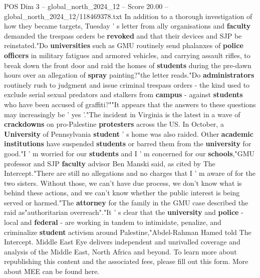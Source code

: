 \begin{textsample}{POS Dim 3 – global\_north\_2024\_12 – Score 20.00 – global\_north\_2024\_12/118469378.txt}
In addition to a thorough investigation of how they became targets, Tuesday ' s letter from ally organisations and \textbf{faculty} demanded the trespass orders be \textbf{revoked} and that their devices and SJP be reinstated."Do \textbf{universities} such as GMU routinely send phalanxes of \textbf{police} \textbf{officers} in military fatigues and armored vehicles, and carrying assault rifles, to break down the front door and raid the homes of \textbf{students} during the pre-dawn hours over an allegation of \textbf{spray} painting?"the letter reads."Do \textbf{administrators} routinely rush to judgment and issue criminal trespass orders - the kind used to exclude serial sexual predators and stalkers from \textbf{campus} - against \textbf{students} who have been accused of graffiti?""It appears that the answers to these questions may increasingly be ' yes '."The incident in Virginia is the latest in a wave of \textbf{crackdowns} on pro-Palestine \textbf{protesters} across the US.
In October, a \textbf{University} of Pennsylvania \textbf{student} ' s home was also raided.
Other \textbf{academic} \textbf{institutions} have suspended \textbf{students} or barred them from the \textbf{university} for good."I ' m worried for our \textbf{students} and I ' m concerned for our \textbf{schools},"GMU professor and SJP \textbf{faculty} advisor Ben Manski said, as cited by The Intercept."There are still no allegations and no charges that I ' m aware of for the two sisters.
Without those, we can't have due process, we don't know what is behind these actions, and we can't know whether the public interest is being served or harmed."The \textbf{attorney} for the family in the GMU case described the raid as"authoritarian overreach"."It ' s clear that the \textbf{university} and \textbf{police} - local and \textbf{federal} - are working in tandem to intimidate, penalize, and criminalize \textbf{student} activism around Palestine,"Abdel-Rahman Hamed told The Intercept.
Middle East Eye delivers independent and unrivalled coverage and analysis of the Middle East, North Africa and beyond.
To learn more about republishing this content and the associated fees, please fill out this form.
More about MEE can be found here.

\end{textsample}
